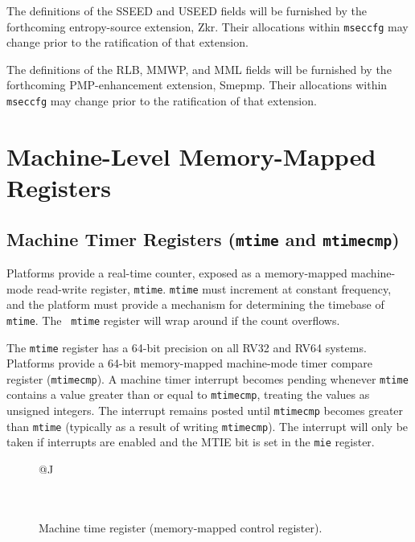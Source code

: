 The definitions of the SSEED and USEED fields will be furnished by the
forthcoming entropy-source extension, Zkr.
Their allocations within {\tt mseccfg} may change prior to the ratification
of that extension.

The definitions of the RLB, MMWP, and MML fields will be furnished by the
forthcoming PMP-enhancement extension, Smepmp.
Their allocations within {\tt mseccfg} may change prior to the ratification
of that extension.

\section{Machine-Level Memory-Mapped Registers}

\subsection{Machine Timer Registers ({\tt mtime} and {\tt mtimecmp})}

Platforms provide a real-time counter, exposed as a memory-mapped
machine-mode read-write register, {\tt mtime}.  {\tt mtime} must
increment at constant frequency, and the platform must provide a
mechanism for determining the timebase of {\tt mtime}.  The {\tt
	mtime} register will wrap around if the count overflows.

The {\tt mtime} register has a 64-bit precision on all RV32 and RV64
systems.  Platforms provide a 64-bit memory-mapped machine-mode
timer compare register ({\tt mtimecmp}).
A machine timer interrupt becomes pending whenever {\tt mtime} contains
a value greater than or equal to {\tt mtimecmp}, treating the values
as unsigned integers.
The interrupt remains posted until {\tt mtimecmp} becomes greater than
{\tt mtime} (typically as a result of writing {\tt mtimecmp}).
The interrupt will only be taken if interrupts
are enabled and the MTIE bit is set in the {\tt mie} register.

\begin{figure}[h!]
	{\footnotesize
		\begin{center}
			\begin{tabular}{@{}J}
				 \\
				\hline
				 \\
				 \\
			\end{tabular}
		\end{center}
	}
	\vspace{-0.1in}
	\caption{Machine time register (memory-mapped control register).}
\end{figure}

